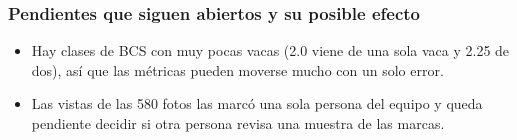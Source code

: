 \subsubsection*{Pendientes que siguen abiertos y su posible efecto}

\begin{itemize}
  \item Hay clases de BCS con muy pocas vacas (2.0 viene de una sola vaca y 2.25 de dos), así que las métricas pueden moverse mucho con un solo error.
  \item Las vistas de las 580 fotos las marcó una sola persona del equipo y queda pendiente decidir si otra persona revisa una muestra de las marcas.
\end{itemize}
